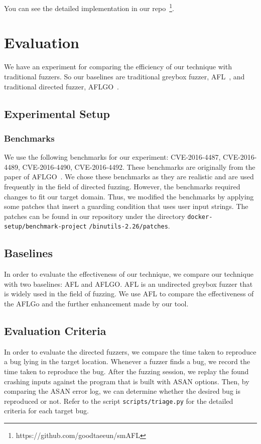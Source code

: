 \documentclass[12pt]{sigplanconf}
\begin{document}
You can see the detailed implementation in our repo~\footnote{https://github.com/goodtaeeun/smAFL}.

\section{Evaluation}
We have an experiment for comparing the efficiency of our technique with traditional fuzzers. So our baselines are traditional
greybox fuzzer, AFL~\cite{aflfuzz}, and traditional directed fuzzer, AFLGO~\cite{bohme:ccs:2017}.

\subsection{Experimental Setup}

\subsubsection{Benchmarks}
We use the following benchmarks for our experiment: CVE-2016-4487, CVE-2016-4489, CVE-2016-4490, CVE-2016-4492.
These benchmarks are originally from the paper of AFLGO~\cite{bohme:ccs:2017}.
We chose these benchmarks as they are realistic and are used frequently in the field of directed fuzzing.
However, the benchmarks required changes to fit our target domain.
Thus, we modified the benchmarks by applying some patches that insert a guarding condition that uses user input strings.
The patches can be found in our repository under the directory
\texttt{docker-setup/benchmark-project}
\texttt{/binutils-2.26/patches}.

\subsection{Baselines}
In order to evaluate the effectiveness of our technique, we compare our technique with two baselines: AFL and AFLGO.
AFL is an undirected greybox fuzzer that is widely used in the field of fuzzing. We use AFL to compare the effectiveness
of the AFLGo and the further enhancement made by our tool.

\subsection{Evaluation Criteria}
In order to evaluate the directed fuzzers, we compare the time taken to reproduce a bug lying in the target location.
Whenever a fuzzer finds a bug, we record the time taken to reproduce the bug.
After the fuzzing session, we replay the found crashing inputs against the program that is built with ASAN options.
Then, by comparing the ASAN error log, we can determine whether the desired bug is reproduced or not.
Refer to the script \texttt{scripts/triage.py} for the detailed criteria for each target bug.
\end{document}
